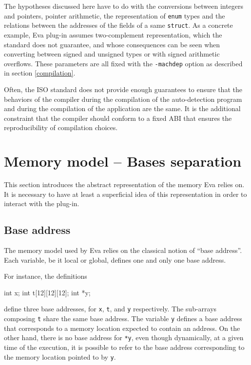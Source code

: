\documentclass[web]{frama-c-book}
\newcommand{\Eva}{\textsf{Eva}}
\begin{document}
The hypotheses discussed here have to do with the conversions
between integers and pointers, pointer arithmetic, the representation
of \lstinline|enum| types and the relations between the addresses of the
fields of a same \lstinline|struct|. As a concrete example, \Eva{}
plug-in assumes two-complement representation,
which the standard does not guarantee, 
and whose consequences can be seen when converting between
signed and unsigned types or with signed arithmetic overflows.
These parameters are all fixed with the \lstinline|-machdep| option
as described in section \ref{compilation}.

Often, the ISO standard does not provide enough guarantees to
ensure that the behaviors of the compiler during the compilation
of the auto-detection program and during the compilation of the application
are the same. It is the additional constraint that the compiler should conform
to a fixed ABI that ensures the reproducibility of compilation choices.

\section{Memory model -- Bases separation}\label{bases}

This section introduces the abstract representation of the memory
\Eva{} relies on. It is necessary to have
at least a superficial idea of this representation in order to
interact with the plug-in.

\subsection{Base address}
The memory model used by \Eva{} relies on the classical notion
of ``base address''. Each variable, be it local or global, defines one
and only one base address.
\goodbreak

For instance, the definitions
\begin{listing}{1}
int x;
int t[12][12][12];
int *y;
\end{listing}
define three base addresses, for \lstinline|x|,
\lstinline|t|, and \lstinline|y| respectively.
The sub-arrays composing \lstinline|t| share the same base address.
The variable \lstinline|y| defines a base address that corresponds to
a memory location expected to contain an address.
On the other hand, there is no base address for \lstinline|*y|, even
though dynamically, at a given time of the execution, it is
possible to refer to the base address corresponding to the memory
location pointed to by \lstinline|y|.
\end{document}

